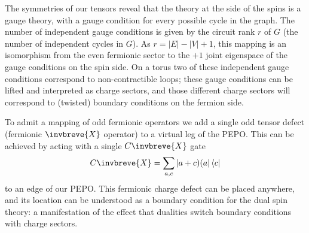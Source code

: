 \documentclass[aps,prx,twocolumn,floatfix,10pt,amssymb,amsfont,amsmath,superscriptaddress,float,nofootinbib,longbibliography,nobalancelastpage]{revtex4-2}
\begin{document}
The symmetries of our tensors reveal that the theory at the side of the spins is a gauge theory, with a gauge condition for every possible cycle in the graph. The number of independent gauge conditions is given by the circuit rank $r$ of $G$ (the number of independent cycles in $G$). As $r = |E| - |V| + 1$, this mapping is an isomorphism from the even fermionic sector to the $+1$ joint eigenspace of the gauge conditions on the spin side. On a torus two of these independent gauge conditions correspond to non-contractible loops; these gauge conditions can be lifted and interpreted as charge sectors, and those different charge sectors will correspond to (twisted) boundary conditions on the fermion side.



To admit a mapping of odd fermionic operators we add a single odd tensor defect (fermionic $\invbreve{X}$ operator) to a virtual leg of the PEPO. This can be achieved by acting with a single $C\invbreve{X}$ gate
\begin{equation}
    C\invbreve{X} = \sum_{a,c} |a+c) (a| \bra{c}
\end{equation}
to an edge of our PEPO. This fermionic charge defect can be placed anywhere, and its location can be understood as a boundary condition for the dual spin theory: a manifestation of the effect that dualities switch boundary conditions with charge sectors.  


\end{document}
